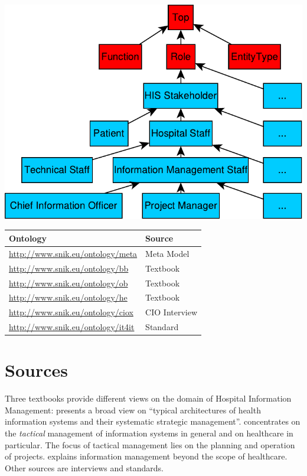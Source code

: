 \documentclass[sw]{iosart2x}
\renewcommand{\citet}{\cite}%
\renewcommand{\citep}{\cite}%
\begin{document}
\includegraphics[width=\columnwidth]{img/hierarchy.pdf}
\begin{center}
\begin{tabular*}{\columnwidth}{ll}
\toprule
\textbf{Ontology}				&\textbf{Source}\\
\midrule
\url{http://www.snik.eu/ontology/meta}		&Meta Model\\
\url{http://www.snik.eu/ontology/bb}		&Textbook~\cite{bb}\\
\url{http://www.snik.eu/ontology/ob}		&Textbook~\cite{ob}\\
\url{http://www.snik.eu/ontology/he}		&Textbook~\cite{he}\\
\url{http://www.snik.eu/ontology/ciox}		&CIO Interview\\
\url{http://www.snik.eu/ontology/it4it}		&Standard~\cite{it4it}\\
\bottomrule
\end{tabular*}
\end{center}

\section{Sources}\label{sec:sources}
Three textbooks provide different views on the domain of Hospital Information Management:
\citet{bb} presents a broad view on \enquote{typical architectures of health information systems and their systematic strategic management}.
\citep{ob} concentrates on the \emph{tactical} management of information systems in general and on healthcare in particular.
The focus of tactical management lies on the planning and operation of projects.  
\citet{he} explains information management beyond the scope of healthcare. 
Other sources are interviews and standards.
\end{document}
